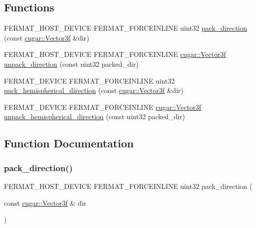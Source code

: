 \subsection*{Functions}
\begin{DoxyCompactItemize}
\item 
F\+E\+R\+M\+A\+T\+\_\+\+H\+O\+S\+T\+\_\+\+D\+E\+V\+I\+CE F\+E\+R\+M\+A\+T\+\_\+\+F\+O\+R\+C\+E\+I\+N\+L\+I\+NE uint32 \hyperlink{group___vertex_geometry_ga36aaf2cd5d29c0fc2abe5d95f9739f95}{pack\+\_\+direction} (const \hyperlink{structcugar_1_1_vector}{cugar\+::\+Vector3f} \&dir)
\item 
F\+E\+R\+M\+A\+T\+\_\+\+H\+O\+S\+T\+\_\+\+D\+E\+V\+I\+CE F\+E\+R\+M\+A\+T\+\_\+\+F\+O\+R\+C\+E\+I\+N\+L\+I\+NE \hyperlink{structcugar_1_1_vector}{cugar\+::\+Vector3f} \hyperlink{group___vertex_geometry_gab56236f4d0e367a082d3dc83df137d79}{unpack\+\_\+direction} (const uint32 packed\+\_\+dir)
\item 
F\+E\+R\+M\+A\+T\+\_\+\+D\+E\+V\+I\+CE F\+E\+R\+M\+A\+T\+\_\+\+F\+O\+R\+C\+E\+I\+N\+L\+I\+NE uint32 \hyperlink{group___vertex_geometry_ga793b5be6152fde6d9ebe072b3a91ab19}{pack\+\_\+hemispherical\+\_\+direction} (const \hyperlink{structcugar_1_1_vector}{cugar\+::\+Vector3f} \&dir)
\item 
F\+E\+R\+M\+A\+T\+\_\+\+D\+E\+V\+I\+CE F\+E\+R\+M\+A\+T\+\_\+\+F\+O\+R\+C\+E\+I\+N\+L\+I\+NE \hyperlink{structcugar_1_1_vector}{cugar\+::\+Vector3f} \hyperlink{group___vertex_geometry_gaf8adf4e00e9634afcd384e2e68eebd0a}{unpack\+\_\+hemispherical\+\_\+direction} (const uint32 packed\+\_\+dir)
\end{DoxyCompactItemize}


\subsection{Function Documentation}
\mbox{\label{group___vertex_geometry_ga36aaf2cd5d29c0fc2abe5d95f9739f95}} 
\subsubsection{\texorpdfstring{pack\+\_\+direction()}{pack\_direction()}}
{\footnotesize\ttfamily F\+E\+R\+M\+A\+T\+\_\+\+H\+O\+S\+T\+\_\+\+D\+E\+V\+I\+CE F\+E\+R\+M\+A\+T\+\_\+\+F\+O\+R\+C\+E\+I\+N\+L\+I\+NE uint32 pack\+\_\+direction (\begin{DoxyParamCaption}\item[{const \hyperlink{structcugar_1_1_vector}{cugar\+::\+Vector3f} \&}]{dir }\end{DoxyParamCaption})}

